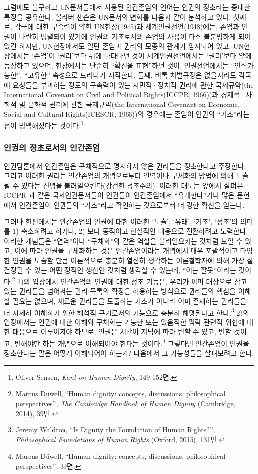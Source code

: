 그럼에도 불구하고 UN문서들에서 사용된 인간존엄의 언어는 인권의 정초라는 중대한 특징을 공유한다. 올리버 센슨은 UN문서의 변화를 다음과 같이 분석하고 있다. 첫째로, 각국에 대한 구속력이 약한 UN헌장(1945)과 세계인권선언(1948)에는, 존엄과 인권이 나란히 병렬되어 있기에 인권의 기초로서의 존엄의 사용이 다소 불분명하게 되어있긴 하지만, UN헌장에서도 일단 존엄과 권리의 모종의 관계가 암시되어 있고, UN헌장에서는 `존엄'이 `권리'보다 뒤에 나타나던 것이 세계인권선언에서는 `권리'보다 앞에 등장하고 있으며, 헌장에서는 단순히 ``확신을 표현''하던 것이, 인권선언에서는 ``인식가능한'', ``고유한'' 속성으로 드러나기 시작한다. 둘째, 비록 처벌규정은 없을지라도 각국에 요청들을 부과하는 정도의 구속력이 있는 시민적·정치적 권리에 관한 국제규약(the International Covenant on Civil and Political Rights(ICCPR, 1966))과 경제적·사회적 및 문화적 권리에 관한 국제규약(the International Covenant on Economic, Social and Cultural Rights(ICESCR, 1966))의 경우에는 존엄이 인권의 ``기초''라는 점이 명백해졌다는 것이다.\footnote{Oliver Sensen, \emph{Kant on Human Dignity}, 149-152면.}

\subsubsection{인권의 정초로서의 인간존엄}

인권담론에서 인간존엄은 구체적으로 명시하지 않은 권리들을 정초한다고 주장한다. 그리고 이러한 권리는 인간존엄의 개념으로부터 연역이나 구체화의 방법에 의해 도출될 수 있다는 신념을 불러일으킨다(강건한 정초주의). 이러한 태도는 앞에서 살펴본 ICCPR 과 같은 국제인권문서들이 인권들이 인간존엄에서 ``유래한다''거나 많은 문헌에서 인간존엄이 인권들의 ``기초''라고 확언하는 것으로부터 더 강한 확신을 얻는다.

그러나 한편에서는 인간존엄의 인권에 대한 이러한 `도출', `유래', `기초', `정초'의 의미를 1) 축소하려고 하거나, 2) 보다 동적이고 현실적인 대응으로 전환하려고 노력한다. 이러한 개념들은 ``연역''이나 ``구체화''와 같은 역할을 불러일으키는 것처럼 보일 수 있고, 이에 따라 인권을 구체화하는 것은 인간존엄이라는 개념에서 매우 포괄적이고 다양한 인권을 도출할 만큼 이론적으로 충분히 열심히 생각하는 이론철학자에 의해 가장 잘 결정될 수 있는 어떤 정적인 생산인 것처럼 생각할 수 있는데, ``이는 잘못''이라는 것이다.\footnote{Marcus Düwell, ``Human dignity: concepts, discussions, philosophical perspectives'', \emph{The Cambridge Handbook of Human Dignity} (Cambridge, 2014), 39면.} 1)의 입장에서 인간존엄의 인권에 대한 정초 기능은, 우리가 이미 대상으로 삼고 있는 권리들을 넘어서는 권리 목록의 확장을 허용하는 방식으로 권리들의 핵심을 이해할 필요는 없으며, 새로운 권리들을 도출하는 기초가 아니라 이미 존재하는 권리들을 더 자세히 이해하기 위한 해석적 근거로서의 기능으로 충분히 해명된다고 한다.\footnote{Jeremy Waldron, ``Is Dignity the Foundation of Human Rights?'', \emph{Philosophical Foundations of Human Rights} (Oxford, 2015), 131면.} 2)의 입장에서는 인권에 대한 이해와 구체화는 가능한 또는 있음직한 맥락-관련적 위협에 대한 대응으로 이루어져야 하므로, 인권은 시간이 지남에 따라 변할 수 있고, 변할 것이고, 변해야만 하는 개념으로 이해되어야 한다는 것이다.\footnote{Marcus Düwell, ``Human dignity: concepts, discussions, philosophical perspectives'', 39면.} 그렇다면 인간존엄이 인권을 정초한다는 말은 어떻게 이해되어야 하는가? 다음에서 그 가능성들을 살펴보려고 한다.


